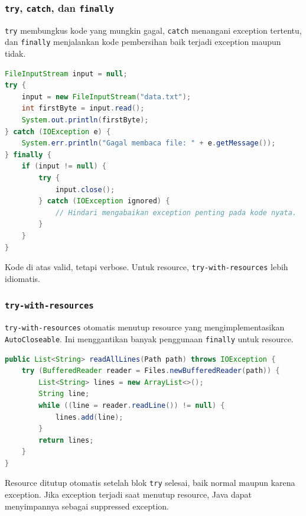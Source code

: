 \subsubsection{\texttt{try}, \texttt{catch}, dan \texttt{finally}}

\begin{jawab}
\texttt{try} membungkus kode yang mungkin gagal, \texttt{catch} menangani exception tertentu, dan \texttt{finally} menjalankan kode pembersihan baik terjadi exception maupun tidak.
\end{jawab}

\begin{lstlisting}[language=Java, caption={try-catch-finally}, label={lst:try-catch-finally}]
FileInputStream input = null;
try {
    input = new FileInputStream("data.txt");
    int firstByte = input.read();
    System.out.println(firstByte);
} catch (IOException e) {
    System.err.println("Gagal membaca file: " + e.getMessage());
} finally {
    if (input != null) {
        try {
            input.close();
        } catch (IOException ignored) {
            // Hindari mengabaikan exception penting pada kode nyata.
        }
    }
}
\end{lstlisting}

Kode di atas valid, tetapi verbose. Untuk resource, \texttt{try-with-resources} lebih idiomatis.

\subsubsection{\texttt{try-with-resources}}

\begin{jawab}
\texttt{try-with-resources} otomatis menutup resource yang mengimplementasikan \texttt{AutoCloseable}. Ini menggantikan banyak penggunaan \texttt{finally} untuk resource.
\end{jawab}

\begin{lstlisting}[language=Java, caption={try-with-resources}, label={lst:try-with-resources-exception}]
public List<String> readAllLines(Path path) throws IOException {
    try (BufferedReader reader = Files.newBufferedReader(path)) {
        List<String> lines = new ArrayList<>();
        String line;
        while ((line = reader.readLine()) != null) {
            lines.add(line);
        }
        return lines;
    }
}
\end{lstlisting}

Resource ditutup otomatis setelah blok \texttt{try} selesai, baik normal maupun karena exception. Jika exception terjadi saat menutup resource, Java dapat menyimpannya sebagai suppressed exception.

